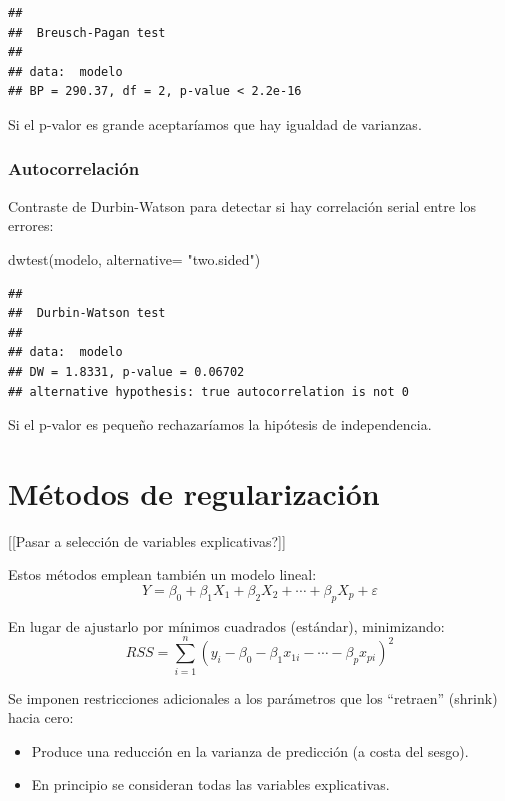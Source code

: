 \documentclass[
]{book}
\newenvironment{Shaded}{\begin{snugshade}}{\end{snugshade}}
\newcommand{\AttributeTok}[1]{\textcolor[rgb]{0.77,0.63,0.00}{#1}}
\newcommand{\FunctionTok}[1]{\textcolor[rgb]{0.00,0.00,0.00}{#1}}
\newcommand{\NormalTok}[1]{#1}
\newcommand{\StringTok}[1]{\textcolor[rgb]{0.31,0.60,0.02}{#1}}
\theoremstyle{break}
\theoremstyle{nonumberplain}
\begin{document}
\begin{verbatim}
## 
##  Breusch-Pagan test
## 
## data:  modelo
## BP = 290.37, df = 2, p-value < 2.2e-16
\end{verbatim}

Si el p-valor es grande aceptaríamos que hay igualdad de varianzas.

\hypertarget{autocorrelaciuxf3n}{%
\subsubsection{Autocorrelación}\label{autocorrelaciuxf3n}}

Contraste de Durbin-Watson para detectar si hay correlación serial entre los errores:

\begin{Shaded}
\begin{Highlighting}[]
\FunctionTok{dwtest}\NormalTok{(modelo, }\AttributeTok{alternative=} \StringTok{"two.sided"}\NormalTok{)}
\end{Highlighting}
\end{Shaded}

\begin{verbatim}
## 
##  Durbin-Watson test
## 
## data:  modelo
## DW = 1.8331, p-value = 0.06702
## alternative hypothesis: true autocorrelation is not 0
\end{verbatim}

Si el p-valor es pequeño rechazaríamos la hipótesis de independencia.

\hypertarget{muxe9todos-de-regularizaciuxf3n}{%
\section{Métodos de regularización}\label{muxe9todos-de-regularizaciuxf3n}}

{[}{[}Pasar a selección de variables explicativas?{]}{]}

Estos métodos emplean también un modelo lineal:
\[Y=\beta_{0}+\beta_{1}X_{1}+\beta_{2}X_{2}+\cdots+\beta_{p}X_{p}+\varepsilon\]

En lugar de ajustarlo por mínimos cuadrados (estándar), minimizando:
\[ RSS = \sum\limits_{i=1}^{n}\left(  y_{i} - \beta_0 - \beta_1 x_{1i} - \cdots - \beta_p x_{pi} \right)^{2}\]

Se imponen restricciones adicionales a los parámetros que los
``retraen'' (shrink) hacia cero:

\begin{itemize}
\item
  Produce una reducción en la varianza de predicción (a
  costa del sesgo).
\item
  En principio se consideran todas las variables explicativas.
\end{itemize}
\end{document}
